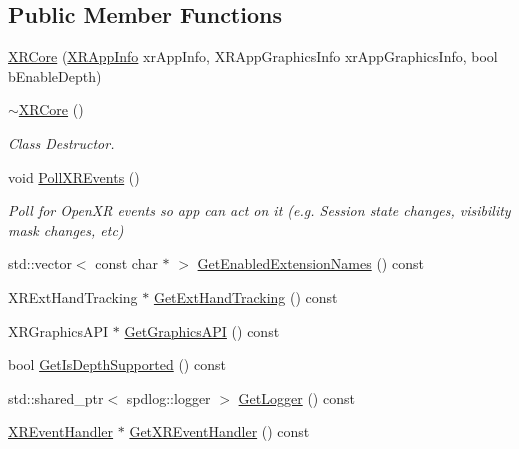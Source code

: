 \subsection*{Public Member Functions}
\begin{DoxyCompactItemize}
\item 
\mbox{\hyperlink{class_open_x_r_provider_1_1_x_r_core_ab74557f890dd3923a516bf6e34f45f5a}{X\+R\+Core}} (\mbox{\hyperlink{struct_open_x_r_provider_1_1_x_r_app_info}{X\+R\+App\+Info}} xr\+App\+Info, X\+R\+App\+Graphics\+Info xr\+App\+Graphics\+Info, bool b\+Enable\+Depth)
\item 
\mbox{\hyperlink{class_open_x_r_provider_1_1_x_r_core_a97834512f231ae35db5754d58e21a586}{$\sim$\+X\+R\+Core}} ()
\begin{DoxyCompactList}\small\item\em Class Destructor. \end{DoxyCompactList}\item 
void \mbox{\hyperlink{class_open_x_r_provider_1_1_x_r_core_af9c576e48d1b1d5eec465b8643900560}{Poll\+X\+R\+Events}} ()
\begin{DoxyCompactList}\small\item\em Poll for Open\+XR events so app can act on it (e.\+g. Session state changes, visibility mask changes, etc) \end{DoxyCompactList}\item 
std\+::vector$<$ const char $\ast$ $>$ \mbox{\hyperlink{class_open_x_r_provider_1_1_x_r_core_ab3b4c28e69003bc40ee491d6fd1dc708}{Get\+Enabled\+Extension\+Names}} () const
\item 
X\+R\+Ext\+Hand\+Tracking $\ast$ \mbox{\hyperlink{class_open_x_r_provider_1_1_x_r_core_a087507fd11303714034a29d87b995eec}{Get\+Ext\+Hand\+Tracking}} () const
\item 
X\+R\+Graphics\+A\+PI $\ast$ \mbox{\hyperlink{class_open_x_r_provider_1_1_x_r_core_a879f310d9e2c44bb6618df996e56a7a1}{Get\+Graphics\+A\+PI}} () const
\item 
bool \mbox{\hyperlink{class_open_x_r_provider_1_1_x_r_core_ab7899cb6ffb6237f7add041023ca5fc6}{Get\+Is\+Depth\+Supported}} () const
\item 
std\+::shared\+\_\+ptr$<$ spdlog\+::logger $>$ \mbox{\hyperlink{class_open_x_r_provider_1_1_x_r_core_a7e1827a985837520af9f406633abbe69}{Get\+Logger}} () const
\item 
\mbox{\hyperlink{class_open_x_r_provider_1_1_x_r_event_handler}{X\+R\+Event\+Handler}} $\ast$ \mbox{\hyperlink{class_open_x_r_provider_1_1_x_r_core_a6562155859246e94fdf753b31b7dee33}{Get\+X\+R\+Event\+Handler}} () const

\end{DoxyCompactItemize}
